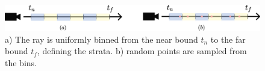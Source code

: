 \begin{figure}[h]
    \centering
    \includegraphics[width=1.0\textwidth]{figures/stratified-sampling.png}
    \caption{a) The ray is uniformly binned from the near bound $t_n$ to the far bound $t_f$, defining the strata. b) random points are sampled from the bins.}
    \label{fig:stratified-sampling}
\end{figure}